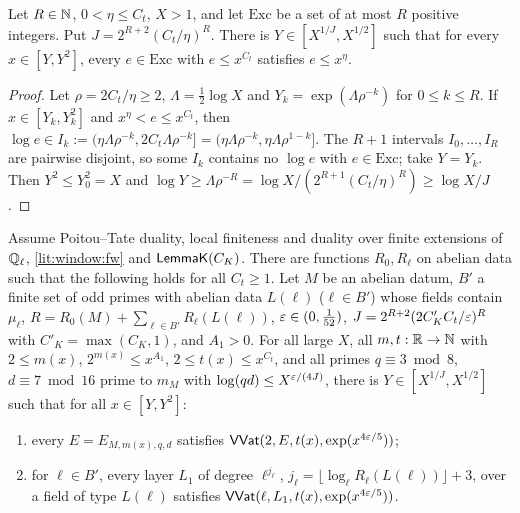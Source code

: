 \begin{lemma}\label{lem:window:window}
Let $R\in\mathbb{N}$, $0<\eta\le C_t$, $X>1$, and let $\mathrm{Exc}$ be a set of at most $R$ positive integers. Put
$J=2^{R+2}(C_t/\eta)^R$. There is $Y\in[X^{1/J},X^{1/2}]$ such that for every $x\in[Y,Y^2]$, every
$e\in\mathrm{Exc}$ with $e\le x^{C_t}$ satisfies $e\le x^{\eta}$.
\end{lemma}

\begin{proof}
Let $\rho=2C_t/\eta\ge2$, $\Lambda=\frac12\log X$ and $Y_k=\exp(\Lambda\rho^{-k})$ for $0\le k\le R$. If
$x\in[Y_k,Y_k^2]$ and $x^\eta<e\le x^{C_t}$, then $\log e\in I_k:=(\eta\Lambda\rho^{-k},2C_t\Lambda\rho^{-k}]
=(\eta\Lambda\rho^{-k},\eta\Lambda\rho^{1-k}]$. The $R+1$ intervals $I_0,\dots,I_R$ are pairwise disjoint, so some
$I_k$ contains no $\log e$ with $e\in\mathrm{Exc}$; take $Y=Y_k$. Then $Y^2\le Y_0^2=X$ and
$\log Y\ge\Lambda\rho^{-R}=\log X/(2^{R+1}(C_t/\eta)^R)\ge\log X/J$.
\end{proof}

\begin{theorem}\Fmark\label{thm:window:bab}
Assume Poitou--Tate duality, local finiteness and duality over finite extensions of $\mathbb{Q}_\ell$, \cref{lit:window:fw}
and $\mathsf{LemmaK}(C_K)$. There are functions $R_0,R_\ell$ on abelian data such that the following holds for all
$C_t\ge1$. Let $M$ be an abelian datum, $B'$ a finite set of odd primes with abelian data $L(\ell)$ ($\ell\in B'$)
whose fields contain $\mu_\ell$, $R=R_0(M)+\sum_{\ell\in B'}R_\ell(L(\ell))$, $\varepsilon\in(0,\frac1{52})$,
$J=2^{R+2}(2C'_KC_t/\varepsilon)^R$ with $C'_K=\max(C_K,1)$, and $A_1>0$. For all large $X$, all $m,t:\mathbb{R}\to\mathbb{N}$ with $2\le m(x)$,
$2^{m(x)}\le x^{A_1}$, $2\le t(x)\le x^{C_t}$, and all primes $q\equiv3\bmod8$, $d\equiv7\bmod16$ prime to $m_M$
with $\log(qd)\le X^{\varepsilon/(4J)}$, there is $Y\in[X^{1/J},X^{1/2}]$ such that for all $x\in[Y,Y^2]$:
\begin{enumerate}[label=(\alph*)]
\item every $E=E_{M,m(x),q,d}$ satisfies $\mathsf{VVat}(2,E,t(x),\exp(x^{4\varepsilon/5}))$;
\item for $\ell\in B'$, every layer $L_1$ of degree $\ell^{j_\ell}$, $j_\ell=\lfloor\log_\ell R_\ell(L(\ell))\rfloor+3$,
  over a field of type $L(\ell)$ satisfies $\mathsf{VVat}(\ell,L_1,t(x),\exp(x^{4\varepsilon/5}))$.
\end{enumerate}
\end{theorem}

